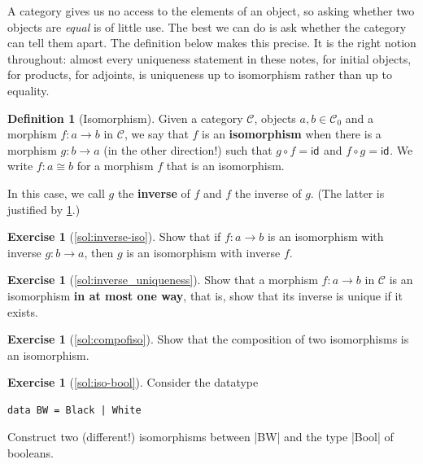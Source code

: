 \documentclass[a4paper,11pt, oneside,titlepage=false]{scrbook}
\theoremstyle{plain}
\theoremstyle{definition}
\newtheorem{rem}[thm]{Remark}
\newtheorem{dfn}[thm]{Definition}
\newtheorem{exer}[thm]{Exercise}
\newcommand{\cfont}[1]{\ensuremath{\mathsf{#1}}}
\newcommand{\Cat}[1]{\mathcal{#1}}
\newcommand{\CC}{\Cat{C}}
\newcommand{\Ob}[1]{{#1}_0}
\newcommand{\CHom}[3]{{#1}(#2,#3)}
\newcommand{\Id}[1][]{\cfont{id}_{#1}}
\newcommand{\co}[2]{\ensuremath{#2 \circ #1}}
\begin{document}
A category gives us no access to the elements of an object, so asking whether
two objects are \emph{equal} is of little use.
The best we can do is ask whether the category can tell them apart.
The definition below makes this precise.
It is the right notion throughout: almost every uniqueness statement in these
notes, for initial objects, for products, for adjoints, is uniqueness up to
isomorphism rather than up to equality.

\begin{dfn}[Isomorphism]
  Given a category $\CC$, objects $a,b \in \Ob{\CC}$ and a morphism $f : a \to b$ in $\CC$, we say that $f$ is an \textbf{isomorphism} when there is a morphism $g : b \to a$ (in the other direction!) such that $\co{f}{g} = \Id$ and $\co{g}{f} = \Id$.
  We write $f : a \cong b$ for a morphism $f$ that is an isomorphism.

  In this case, we call $g$ the \textbf{inverse} of $f$ and $f$ the inverse of $g$. (The latter is justified by \cref{exer:inverse-iso}.)
\end{dfn}

\begin{exer}[\cref{sol:inverse-iso}]\label{exer:inverse-iso}
  Show that if $f : a \to b$ is an isomorphism with inverse $g : b \to a$, then $g$ is an isomorphism with inverse $f$.
\end{exer}

\begin{exer}[\cref{sol:inverse_uniqueness}]\label{exer:inverse_uniqueness}
  Show that a morphism $f : a \to b$ in $\CC$ is an isomorphism \textbf{in at most one way}, that is, show that its inverse is unique if it exists.
\end{exer}

\begin{exer}[\cref{sol:compofiso}]\label{exer:compofiso}
  Show that the composition of two isomorphisms is an isomorphism.
\end{exer}


\begin{exer}[\cref{sol:iso-bool}]\label{exer:iso-bool}
  Consider the datatype
\begin{lstlisting}
data BW = Black | White
\end{lstlisting}
Construct two (different!) isomorphisms between |BW| and the type |Bool| of booleans.
\end{exer}
\end{document}
